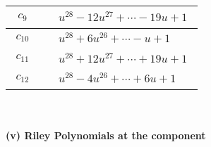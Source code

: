 \documentclass[1p]{elsarticle_modified}
\theoremstyle{definition}
\begin{document}
\begin{tabular}{m{50pt}|m{274pt}}
\hline $$\begin{aligned}c_{9}\end{aligned}$$&$\begin{aligned}
&u^{28}-12 u^{27}+\cdots-19 u+1
\end{aligned}$\\
\hline $$\begin{aligned}c_{10}\end{aligned}$$&$\begin{aligned}
&u^{28}+6 u^{26}+\cdots- u+1
\end{aligned}$\\
\hline $$\begin{aligned}c_{11}\end{aligned}$$&$\begin{aligned}
&u^{28}+12 u^{27}+\cdots+19 u+1
\end{aligned}$\\
\hline $$\begin{aligned}c_{12}\end{aligned}$$&$\begin{aligned}
&u^{28}-4 u^{26}+\cdots+6 u+1
\end{aligned}$\\
\hline
\end{tabular}\\~\\
\newpage\renewcommand{\arraystretch}{1}
\flushleft \textbf{(v) Riley Polynomials at the component}\newline \\
\end{document}
